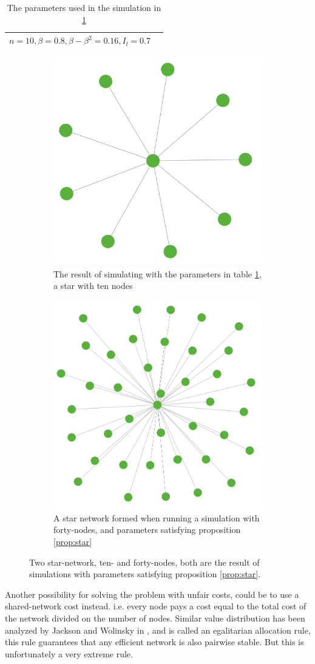 \begin{table}[h]
\centering
\begin{tabular}{lc}
 \hline
  $
  n=10,
  \beta=0.8,
  \beta-\beta^2=0.16,
  I_{l}=0.7$\\
  \hline
\end{tabular}
\caption{The parameters used in the simulation in \ref{fig:star:a} \label{tbl:discountstar}}
\end{table}

\begin{figure}[h]
\centering
\begin{subfigure}{.9\textwidth}
  \centering
 \includegraphics[width=0.4\linewidth]{../Figures/discount/startennodes.png}
  \caption{\label{fig:star:a} The result of simulating with the parameters in table \ref{tbl:discountstar}, a star with ten nodes}
\end{subfigure}
\quad
  
\begin{subfigure}{.9\textwidth}
  \centering
  \includegraphics[width=0.4\linewidth]{../Figures/discount/starmanynodes.png}
  \caption{\label{fig:star:b} A star network formed when running a simulation with forty-nodes, and parameters satisfying proposition \ref{prop:star}}
\end{subfigure}
\caption{\label{fig:star1} Two star-network, ten- and forty-nodes, both are the result of simulations with parameters satisfying proposition \ref{prop:star}.}
\end{figure}


Another possibility for solving the problem with unfair costs, could be to use a shared-network cost instead. i.e. every node pays a cost equal to the total cost of the network divided on the number of nodes. 
Similar value distribution has been analyzed by Jackson and Wolinsky in \cite{jackson1996strategic}, and is called an egalitarian allocation rule, this rule guarantees that any efficient network is also pairwise stable. But this is unfortunately a very extreme rule.





